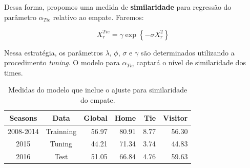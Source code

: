 \documentclass[doc,apacite,oneside,a4paper,12pt]{apa6}
\begin{document}
Dessa forma, propomos uma medida de \textbf{similaridade} para regressão do parâmetro $\alpha_{Tie}$ relativo ao empate. Faremos:

\begin{equation}
X_r^{Tie} = \gamma \exp{\left\{-\sigma X_r ^2\right\}}
\end{equation}

Nessa estratégia, os parâmetros $\lambda$, $\phi$, $\sigma$ e $\gamma$ são determinados utilizando a procedimento \textit{tuning}. O modelo para $\alpha_{Tie}$ captará o nível de similaridade dos times.


\begin{table}[ht]
\centering
\begin{tabular}{cc|r|rrr}
  \hline
Seasons & Data & \textbf{Global} & Home & Tie & Visitor \\ 
  \hline
2008-2014 & Trainning & 56.97 & 80.91 & 8.77 & 56.30 \\ 
  2015 & Tuning & 44.21 & 71.34 & 3.74 & 44.83 \\ 
  2016 & Test & 51.05 & 66.84 & 4.76 & 59.63 \\ 
   \hline
\end{tabular}
    \caption[\scriptsize{Medidas do modelo com similaridade para o empate.}]{\scriptsize{Medidas do modelo que inclue o ajuste para similaridade do empate.}}
    \label{tab:medidasmodsi}
\end{table}	
\end{document}
